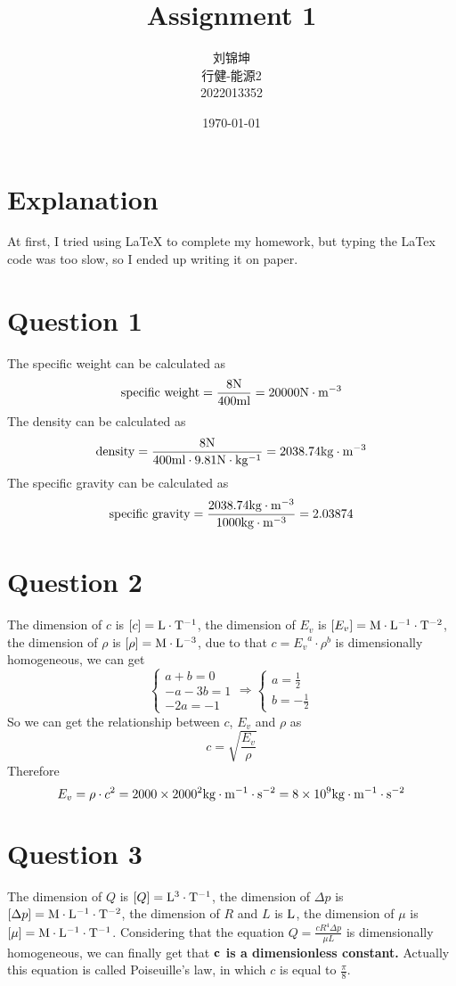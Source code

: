 \documentclass[UTF8]{ctexart}
\title{Assignment 1}
\author{刘锦坤\\行健-能源2\\2022013352}
\date{\today}
\def\r#1{{\rm #1}}
\def\b#1{{\bf #1}}
\def\c{\cdot}
\begin{document}
\fancyfoot[C]{\thepage}

\maketitle

\section*{Explanation}
At first, I tried using LaTeX to complete my homework,
but typing the LaTex code was too slow, so I ended up writing it on paper.

\section*{Question 1}
The specific weight can be calculated as
$$
    \r{specific} \ \r{weight}= \frac{8 \r{N}}{400 \r{ml}} = 20000 \r{N \c m^{-3}}
$$
\noindent The density can be calculated as
$$
    \r{density} = \frac{8 \r{N}}{400 \r{ml} \c 9.81 \r{N \c kg^{-1}}} = 2038.74 \r{kg \c m^{-3}}
$$
\noindent The specific gravity can be calculated as
$$
    \r{specific} \ \r{gravity} = \frac{2038.74 \r{kg \c m^{-3}}}{1000 \r{kg \c m^{-3}}} = 2.03874
$$

\section*{Question 2}
The dimension of $c$ is $[c]=\r{L \c T^{-1}}$, 
the dimension of $E_v$ is $[E_v]=\r{M \c L^{-1} \c T^{-2}}$, 
the dimension of $\rho$ is $[\rho] = \r{M \c L^{-3}}$, 
due to that $c = {E_v}^a\c \rho^b$ is dimensionally homogeneous, we can get
$$
\begin{cases}
    a + b = 0\\
    -a - 3b = 1\\
    -2a = -1
\end{cases}
\Rightarrow
\begin{cases}
    a = \frac{1}{2}\\
    b = -\frac{1}{2}
\end{cases}
$$
\noindent So we can get the relationship between $c$, $E_v$ and $\rho$ as
$$
    c = \sqrt{\frac{E_v}{\rho}}
$$
Therefore
$$
    E_v = \rho \c c^2 = 2000 \times 2000^2 \r{kg \c m^{-1} \c s^{-2}} = 8 \times 10^9 \r{kg \c m^{-1} \c s^{-2}}
$$

\section*{Question 3}
The dimension of $Q$ is $[Q]=\r{L^3 \c T^{-1}}$,
the dimension of $\Delta p$ is $[\Delta p]=\r{M \c L^{-1} \c T^{-2}}$,
the dimension of $R$ and $L$ is $\r{L}$,
the dimension of $\mu$ is $[\mu]=\r{M \c L^{-1} \c T^{-1}}$.
Considering that the equation $Q = \frac{c R^4 \Delta p}{\mu L}$ is dimensionally homogeneous,
we can finally get that \b{$\bf{c}$ is a dimensionless constant.}
Actually this equation is called Poiseuille's law, in which $c$ is equal to $\frac \pi 8$.

\end{document}
